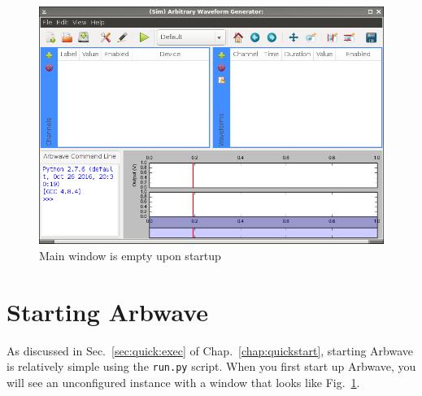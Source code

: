 \thispagestyle{fancy}
\pagestyle{fancy}


\begin{figure}[hb!]
  \centerline{\includegraphics[width=\textwidth]{figures/main-empty}}
  \caption{Main window is empty upon startup}
  \label{fig:quick:main-empty}
\end{figure}



\section{Starting Arbwave}
As discussed in Sec.~\ref{sec:quick:exec} of Chap.~\ref{chap:quickstart},
starting Arbwave is relatively simple using the \verb|run.py| script.
When you first start up Arbwave, you will see an unconfigured instance with a
window that looks like Fig.~\ref{fig:quick:main-empty}.

